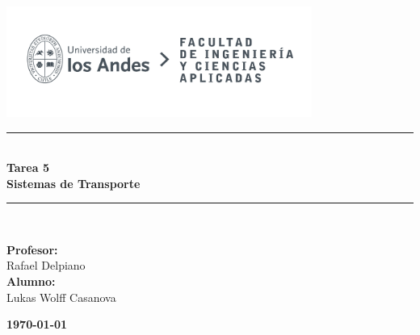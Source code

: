 \documentclass{article}  %
\begin{document}
\begin{titlepage}%
\newcommand{\HRule}{\rule{\linewidth}{0.5mm}} 
\center 
\includegraphics[width=10cm]{LOGO_UNIVERSIDAD.jpg}\\ %
\vspace{3cm}
\HRule \\[0.4cm]
{ \huge \bfseries Tarea 5}\\[0.4cm] %
{ \huge \bfseries Sistemas de Transporte}\\[0.4cm] %
\HRule \\[1.5cm]
 \vspace{5.5cm}
\begin{flushright}
    { \textbf{Profesor:}\\
    Rafael Delpiano\\
    \vspace{0.2cm}
    \textbf{Alumno:} \\
    Lukas Wolff Casanova\\
}
\end{flushright}
\vspace{2cm}
{\large \textbf{\today}}\\[2cm] %
\end{titlepage}
\end{document}
